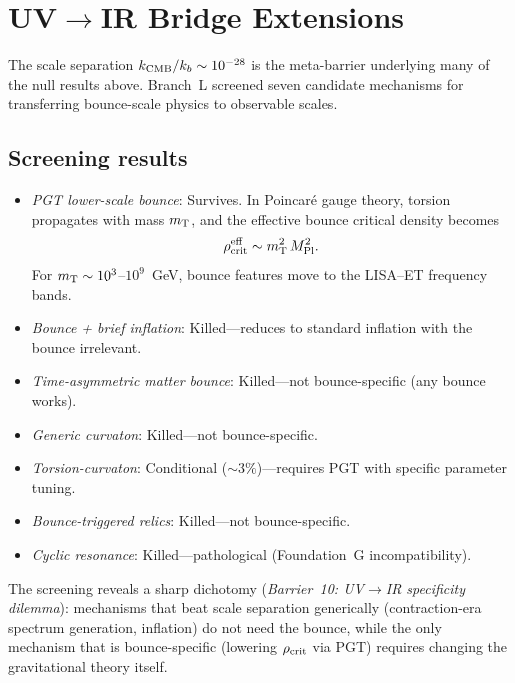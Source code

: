 \documentclass[aps,prd,twocolumn,superscriptaddress,showpacs,preprintnumbers,
  nofootinbib,longbibliography,floatfix]{revtex4-2}
\newcommand{\rhocrit}{\rho_{\rm crit}}
\newcommand{\MPl}{M_{\rm Pl}}
\newcommand{\mT}{m_{\rm T}}
\begin{document}
\section{UV$\to$IR Bridge Extensions}\label{sec:bridge}

The scale separation $k_{\rm CMB}/k_b \sim 10^{-28}$ is the meta-barrier
underlying many of the null results above. Branch~L screened seven
candidate mechanisms for transferring bounce-scale physics to observable
scales.

\subsection{Screening results}

\begin{itemize}[leftmargin=*]
  \item \textit{PGT lower-scale bounce}: Survives. In Poincar\'e gauge
    theory, torsion propagates with mass $\mT$, and the effective bounce
    critical density becomes
    \begin{equation}\label{eq:rhocrit_pgt}
      \rhocrit^{\rm eff} \sim \mT^2\,\MPl^2.
    \end{equation}
    For $\mT \sim 10^3$--$10^9$~GeV, bounce features move to the
    LISA--ET frequency bands.
  \item \textit{Bounce + brief inflation}: Killed---reduces to standard
    inflation with the bounce irrelevant.
  \item \textit{Time-asymmetric matter bounce}: Killed---not
    bounce-specific (any bounce works).
  \item \textit{Generic curvaton}: Killed---not bounce-specific.
  \item \textit{Torsion-curvaton}: Conditional ($\sim\!3\%$)---requires
    PGT with specific parameter tuning.
  \item \textit{Bounce-triggered relics}: Killed---not bounce-specific.
  \item \textit{Cyclic resonance}: Killed---pathological (Foundation~G
    incompatibility).
\end{itemize}

The screening reveals a sharp dichotomy (\textit{Barrier~10: UV$\to$IR
specificity dilemma}): mechanisms that beat scale separation generically
(contraction-era spectrum generation, inflation) do not need the bounce,
while the only mechanism that is bounce-specific (lowering $\rhocrit$ via
PGT) requires changing the gravitational theory itself.
\end{document}
